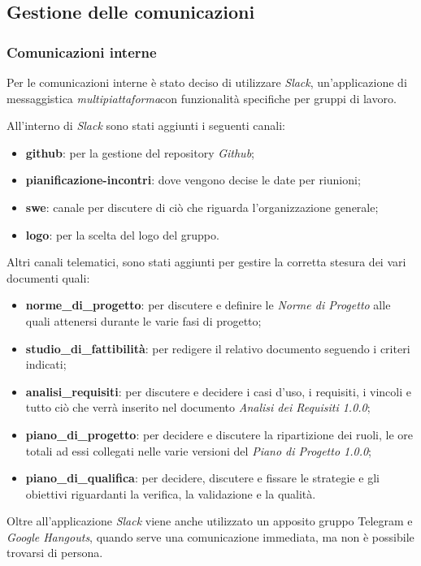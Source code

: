    	\subsection{Gestione delle comunicazioni}
   		\subsubsection{Comunicazioni interne}
   		Per le comunicazioni interne è stato deciso di utilizzare \textit{ Slack\glos}, un'applicazione di messaggistica \textit{multipiattaforma}\glo con funzionalità specifiche per gruppi di lavoro. 
   		
   		\noindent All'interno di \textit{Slack\glo} sono stati aggiunti i seguenti canali:
   		\begin{itemize}
   			\item \textbf{github}: per la gestione del repository \textit{Github\glos};
   			\item \textbf{pianificazione-incontri}: dove vengono decise le date per riunioni;
   			\item \textbf{swe}: canale per discutere di ciò che riguarda l'organizzazione generale;
   			\item \textbf{logo}: per la scelta del logo del gruppo.
   			
   		\end{itemize}
   		Altri canali telematici, sono stati aggiunti per gestire la corretta stesura dei vari documenti quali:
   		\begin{itemize}
   			\item \textbf{norme\_di\_progetto}: per discutere e definire le \textit{Norme di Progetto\doc} alle quali attenersi durante le varie fasi di progetto;
   			\item \textbf{studio\_di\_fattibilità}: per redigere il relativo documento seguendo i criteri indicati;
   			\item \textbf{analisi\_requisiti}: per discutere e decidere i casi d'uso, i requisiti, i vincoli e tutto ciò che verrà inserito nel documento \textit{Analisi dei Requisiti 1.0.0\docs};
   			\item \textbf{piano\_di\_progetto}: per decidere e discutere la ripartizione dei ruoli, le ore totali ad essi collegati nelle varie versioni del \textit{Piano di Progetto 1.0.0\docs};
   			\item \textbf{piano\_di\_qualifica}: per decidere, discutere e fissare le strategie e gli obiettivi riguardanti la verifica, la validazione e la qualità.
   		\end{itemize}
   		Oltre all'applicazione \textit{Slack\glo} viene anche utilizzato un apposito gruppo Telegram e \textit{Google Hangouts\glo}, quando serve una comunicazione immediata, ma non è possibile trovarsi di persona.
   		
